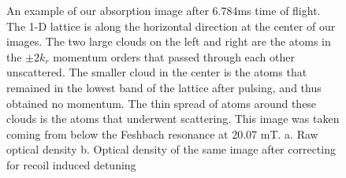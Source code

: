 \documentclass[12pt]{iopart}
\begin{document}
\begin{figure}
\caption{An example of our absorption image after 6.784ms time of flight. The 1-D lattice is along the horizontal direction at the center of our images. The two large clouds on the left and right are the atoms in the $\pm 2k_r$ momentum orders that passed through each other unscattered. The smaller cloud in the center is the atoms that remained in the lowest band of the lattice after pulsing, and thus obtained no momentum. The thin spread of atoms around these clouds is the atoms that underwent scattering.   This image was taken coming from below the Feshbach resonance at 20.07 mT. a. Raw optical density b. Optical density of the same image after correcting for recoil induced detuning}  
\label{fig:SampleCorrection}
\end{figure}
\end{document}

